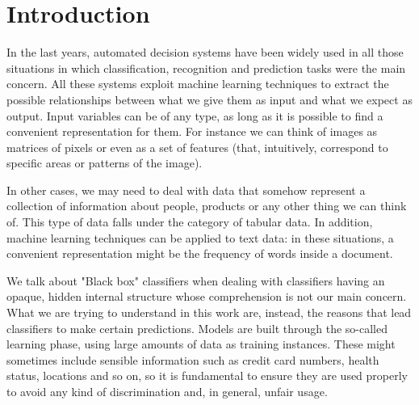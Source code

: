 \documentclass[12pt, twoside, a4paper]{report}
\newcommand{\whitepage}{\clearpage
						\thispagestyle{empty}
						\phantom{a}
						\vfill}
\begin{document}


\whitepage

\sloppy
\nocite{*}


\tableofcontents


\chapter{Introduction}

In the last years, automated decision systems have been widely used in all those situations in which classification, recognition and prediction tasks were the main concern. All these systems exploit machine learning techniques to extract the possible relationships between what we give them as input and what we expect as output. Input variables can be of any type, as long as it is possible to find a convenient representation for them. For instance we can think of images as matrices of pixels or even as a set of features (that, intuitively, correspond to specific areas or patterns of the image). 

In other cases, we may need to deal with data that somehow represent a collection of information about people, products or any other thing we can think of. This type of data falls under the category of tabular data. In addition, machine learning techniques can be applied to text data: in these situations, a convenient representation might be the frequency of words inside a document.

We talk about "Black box" classifiers when dealing with classifiers having an opaque, hidden internal structure whose comprehension is not our main concern. What we are trying to understand in this work are, instead, the reasons that lead classifiers to make certain predictions. Models are built through the so-called learning phase, using large amounts of data as training instances. These might sometimes include sensible information such as credit card numbers, health status, locations and so on, so it is fundamental to ensure they are used properly to avoid any kind of discrimination and, in general, unfair usage. 
\end{document}
